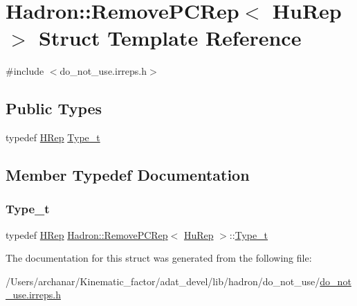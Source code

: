 \hypertarget{structHadron_1_1RemovePCRep_3_01HuRep_01_4}{}\section{Hadron\+:\+:Remove\+P\+C\+Rep$<$ Hu\+Rep $>$ Struct Template Reference}
\label{structHadron_1_1RemovePCRep_3_01HuRep_01_4}


{\ttfamily \#include $<$do\+\_\+not\+\_\+use.\+irreps.\+h$>$}

\subsection*{Public Types}
\begin{DoxyCompactItemize}
\item 
typedef \mbox{\hyperlink{structHadron_1_1HRep}{H\+Rep}} \mbox{\hyperlink{structHadron_1_1RemovePCRep_3_01HuRep_01_4_a522cd18fd592a05606e8538a3e693d3e}{Type\+\_\+t}}
\end{DoxyCompactItemize}


\subsection{Member Typedef Documentation}
\mbox{\label{structHadron_1_1RemovePCRep_3_01HuRep_01_4_a522cd18fd592a05606e8538a3e693d3e}} 
\subsubsection{\texorpdfstring{Type\_t}{Type\_t}}
{\footnotesize\ttfamily typedef \mbox{\hyperlink{structHadron_1_1HRep}{H\+Rep}} \mbox{\hyperlink{structHadron_1_1RemovePCRep}{Hadron\+::\+Remove\+P\+C\+Rep}}$<$ \mbox{\hyperlink{structHadron_1_1HuRep}{Hu\+Rep}} $>$\+::\mbox{\hyperlink{structHadron_1_1RemovePCRep_3_01HuRep_01_4_a522cd18fd592a05606e8538a3e693d3e}{Type\+\_\+t}}}



The documentation for this struct was generated from the following file\+:\begin{DoxyCompactItemize}
\item 
/\+Users/archanar/\+Kinematic\+\_\+factor/adat\+\_\+devel/lib/hadron/do\+\_\+not\+\_\+use/\mbox{\hyperlink{do__not__use_8irreps_8h}{do\+\_\+not\+\_\+use.\+irreps.\+h}}\end{DoxyCompactItemize}
